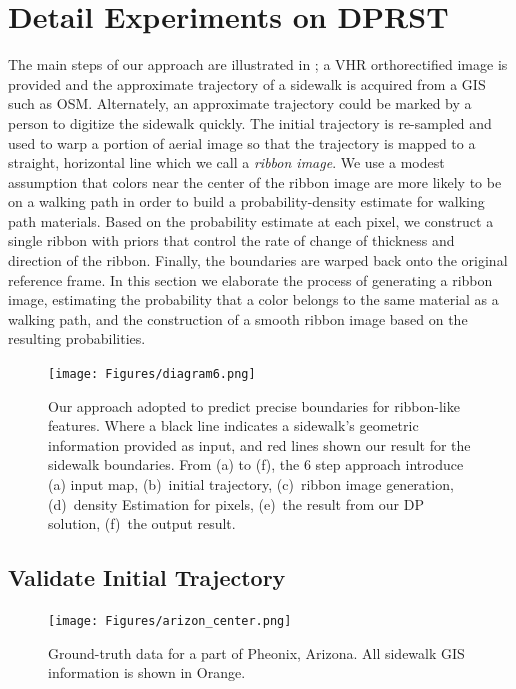 \chapter{Detail Experiments on \ac{DPRST}}

The main steps of our approach are illustrated in ;
 a \ac{VHR} orthorectified image is provided 
 and the approximate trajectory of a sidewalk is acquired from a \ac{GIS} such as \ac{OSM}.
Alternately, an approximate trajectory could be marked by a person to digitize the sidewalk quickly. 
The initial trajectory is re-sampled and used to warp a portion of aerial image so that the trajectory is mapped to a straight, horizontal line which we call a \textit{ribbon image}. 
We use a modest assumption that colors near the center of the ribbon image are more likely to be on a walking path in order to build a probability-density estimate for walking path materials. 
Based on the probability estimate at each pixel, we construct a single ribbon with priors that control the rate of change of thickness and direction of the ribbon. 
Finally, the boundaries are warped back onto the original reference frame. 
In this section we elaborate the process of generating a ribbon image, estimating the probability that a color belongs to the same material as a walking path, and the construction of a smooth ribbon image based on the resulting probabilities. 

\begin{figure}[H]
\begin{center}
\texttt{[image: Figures/diagram6.png]}
\caption[Framework Overview]{Our approach adopted to predict precise boundaries for ribbon-like features. 
Where a black line indicates a sidewalk's geometric information provided as input,
 and red lines shown our result for the sidewalk boundaries.
  From (a) to (f), the 6 step approach introduce 
(a) input map, 
(b)~initial trajectory, 
(c)~ribbon image generation, 
(d)~density Estimation for pixels, 
(e)~the result from our \ac{DP} solution, 
(f)~the output result.}
\label{fig:Apparatus}
\end{center}
\end{figure}

\section{Validate Initial Trajectory}

\begin{figure}[H]
\centering 
\texttt{[image: Figures/arizon\_center.png]}
 \caption[Demonstration on Arizona Center]{
Ground-truth data for a part of Pheonix, Arizona. All sidewalk \ac{GIS}
information is shown in Orange.}
\label{fig:arizon_center}
\end{figure}


